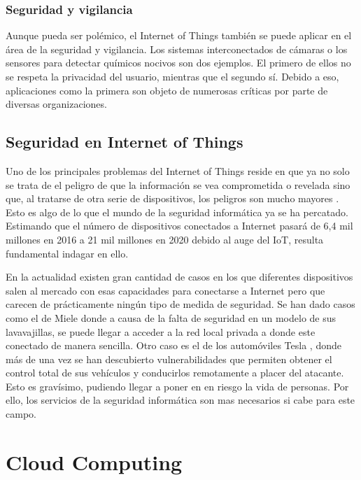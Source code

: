 \subsubsection{Seguridad y vigilancia}

Aunque pueda ser polémico, el Internet of Things también se puede aplicar en el área de la seguridad y vigilancia. Los sistemas interconectados de cámaras o los sensores para detectar químicos nocivos son dos ejemplos. El primero de ellos no se respeta la privacidad del usuario, mientras que el segundo sí. Debido a eso, aplicaciones como la primera son objeto de numerosas críticas por parte de diversas organizaciones.

\subsection{Seguridad en Internet of Things}

Uno de los principales problemas del Internet of Things reside en que ya no solo se trata de el peligro de que la información se vea comprometida o revelada sino que, al tratarse de otra serie de dispositivos, los peligros son mucho mayores \cite{iot-qz}\cite{iot-techradar}. Esto es algo de lo que el mundo de la seguridad informática ya se ha percatado. Estimando que el número de dispositivos conectados a Internet pasará de 6,4 mil millones en 2016 a 21 mil millones en 2020 \cite{iot-searchdatacenter} debido al auge del IoT, resulta fundamental indagar en ello. 

En la actualidad existen gran cantidad de casos en los que diferentes dispositivos salen al mercado con esas capacidades para conectarse a Internet pero que carecen de prácticamente ningún tipo de medida de seguridad. Se han dado casos como el de Miele \cite{iot-miele} donde a causa de la falta de seguridad en un modelo de sus lavavajillas, se puede llegar a acceder a la red local privada a donde este conectado de manera sencilla. Otro caso es el de los automóviles Tesla \cite{iot-tesla}, donde más de una vez se han descubierto vulnerabilidades que permiten obtener el control total de sus vehículos y conducirlos remotamente a placer del atacante. Esto es gravísimo, pudiendo llegar a poner en en riesgo la vida de personas. Por ello, los servicios de la seguridad informática son mas necesarios si cabe para este campo. 


\section{Cloud Computing}

